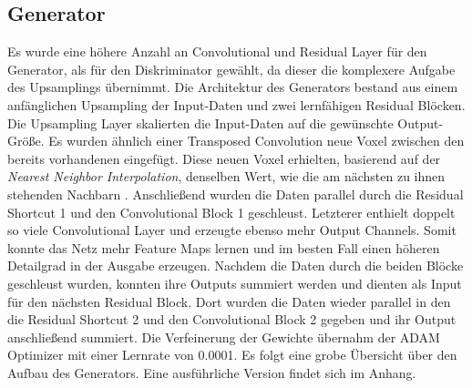 \subsection{Generator}
Es wurde eine höhere Anzahl an Convolutional und Residual Layer für den Generator, als für den Diskriminator gewählt, da dieser die komplexere Aufgabe des Upsamplings übernimmt. Die Architektur des Generators bestand aus einem anfänglichen Upsampling der Input-Daten und zwei lernfähigen Residual Blöcken. Die Upsampling Layer skalierten die Input-Daten auf die gewünschte Output-Größe. Es wurden ähnlich einer Transposed Convolution neue Voxel zwischen den bereits vorhandenen eingefügt. Diese neuen Voxel erhielten, basierend auf der \textit{Nearest Neighbor Interpolation}, denselben Wert, wie die am nächsten zu ihnen stehenden Nachbarn \parencite[]{nearestneighbor}. Anschließend wurden die Daten parallel durch die Residual Shortcut 1 und den Convolutional Block 1 geschleust. Letzterer enthielt doppelt so viele Convolutional Layer und erzeugte ebenso mehr Output Channels. Somit konnte das Netz mehr Feature Maps lernen und im besten Fall einen höheren Detailgrad in der Ausgabe erzeugen. Nachdem die Daten durch die beiden Blöcke geschleust wurden, konnten ihre Outputs summiert werden und dienten als Input für den nächsten Residual Block. Dort wurden die Daten wieder parallel in den die Residual Shortcut 2 und den Convolutional Block 2 gegeben und ihr Output anschließend summiert. Die Verfeinerung der Gewichte übernahm der ADAM Optimizer mit einer Lernrate von 0.0001. Es folgt eine grobe Übersicht über den Aufbau des Generators. Eine ausführliche Version findet sich im Anhang.
\newpage


